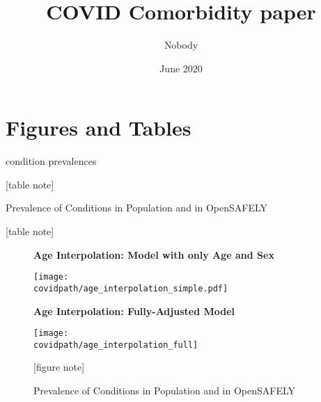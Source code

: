\documentclass[12pt,letterpaper]{article}
\title{COVID Comorbidity paper} \author{Nobody}
\numberwithin{equation}{section}
\begin{document}
\date{June 2020}

  \section{Figures and Tables}
 
   \begin{table}[H]
    \begin{center}
     \caption{condition prevalences }
     
     
     \footnotesize{[table note]}
    \end{center}
   \end{table}
 
  \begin{table}[H]
    \begin{center}
    \caption{Prevalence of Conditions in Population and in OpenSAFELY}
    
    
    \footnotesize{[table note]}
    \end{center}
  \end{table}

  \clearpage
  \begin{figure}[H]
    \begin{center}
    \caption{Prevalence of Conditions in Population and in OpenSAFELY}
    \textbf{Age Interpolation: Model with only Age and Sex}
    
    \texttt{[image: \\covidpath/age\_interpolation\_simple.pdf]}

    \newline
    \textbf{Age Interpolation: Fully-Adjusted Model}
    
    \texttt{[image: \\covidpath/age\_interpolation\_full]}
    
    \footnotesize{[figure note]}
    \end{center}
  \end{figure}
\end{document}
